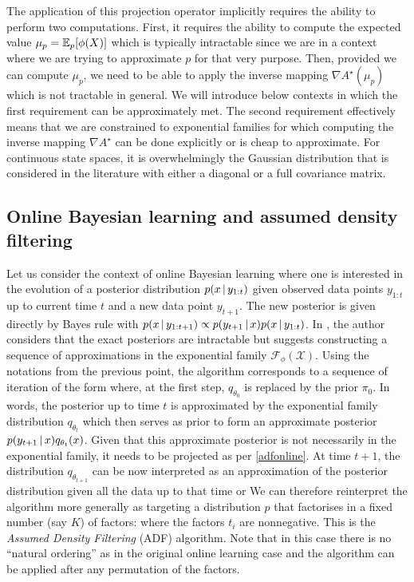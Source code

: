 The application of this projection operator implicitly requires the ability to perform two computations. First, it requires the ability to compute the expected value $\mu_p=\mathbb E_{p}[\phi(X)]$ which is typically intractable since we are in a context where we are trying to approximate $p$ for that very purpose. Then, provided we can compute $\mu_p$, we need to be able to apply the inverse mapping $\nabla A^{\star}(\mu_p)$ which is not tractable in general. We will introduce below contexts in which the first requirement can be approximately met. The second requirement effectively means that we are constrained to exponential families for which computing the inverse mapping $\nabla A^{\star}$ can be done explicitly or is cheap to approximate. For continuous state spaces, it is overwhelmingly the Gaussian distribution that is considered in the literature with either a diagonal or a full covariance matrix.%
%
\subsection{Online Bayesian learning and assumed density filtering}
%
Let us consider the context of online Bayesian learning where one is interested in the evolution of a posterior distribution $p(x\,|\, y_{1:t})$ given observed \iid data points $y_{1:t}$ up to current time $t$ and a new \iid data point $y_{t+1}$. 
The new posterior is given directly by Bayes rule with $p(x\,|\, y_{1:t+1})\propto p(y_{t+1}\,|\, x) p(x\,|\, y_{1:t})$. 
In \citet{opper98}, the author considers that the exact posteriors are intractable but suggests constructing a sequence of approximations in the exponential family $\mathcal F_{\phi}(\mathcal X)$. 
Using the notations from the previous point, the algorithm corresponds to a sequence of iteration of the form
%
%
where, at the first step, $q_{\theta_{0}}$ is replaced by the prior $\pi_{0}$. In words, the posterior up to time $t$ is approximated by the exponential family distribution $q_{\theta_{t}}$ which then serves as prior to form an approximate posterior $p(y_{t+1}\,|\, x)q_{\theta_{t}}(x)$. 
Given that this approximate posterior is not necessarily in the exponential family, it needs to be projected as per \eqref{adfonline}. 
At time $t+1$, the distribution $q_{\theta_{t+1}}$ can be now interpreted as an approximation of the posterior distribution given all the data up to that time or 
%
%
We can therefore reinterpret the algorithm more generally as targeting a distribution $p$ that factorises in a fixed number (say $K$) of factors: 
%
%
where the factors $t_i$ are nonnegative. This is the \emph{Assumed Density Filtering} (ADF) algorithm. Note that in this case there is no ``natural ordering'' as in the original online learning case and the algorithm can be applied after any permutation of the factors.


